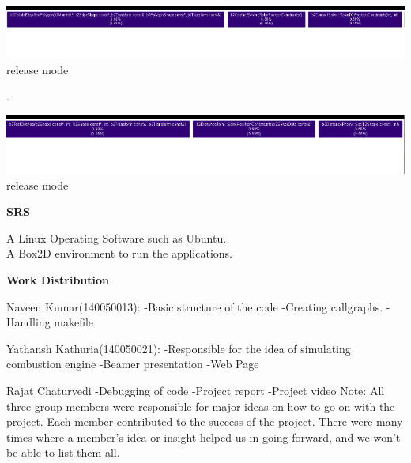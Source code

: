 \documentclass[40pt]{article}
\begin{document}
\begin{center}
\includegraphics[scale=0.4]{release6.png}\newline
\small{release mode\\}
\end{center}

.
\begin{center}
\includegraphics[scale=0.4]{release7.png}\newline
\small{release mode\\}
\end{center}

\newpage



\begin{center}

\huge{
\textbf{SRS\\}}
\end{center}
\Large
{
A Linux Operating Software such as Ubuntu.\\
A Box2D environment to run the applications.\\
}

\begin{center}

\huge{
\textbf{Work Distribution\\}}
\end{center}
\Large
{
Naveen Kumar(140050013):\newline
-Basic structure of the code\newline
-Creating callgraphs.\newline
-Handling makefile\newline
\newline

Yathansh Kathuria(140050021):\newline
-Responsible for the idea of simulating combustion engine\newline
-Beamer presentation\newline
-Web Page\newline
\newline

Rajat Chaturvedi\newline
-Debugging of code\newline
-Project report\newline
-Project video\newline
\newline
Note: All three group members were responsible for major ideas on how to go on with the project. Each member contributed to the success of the project. There were many times where a member's idea or insight helped us in going forward, and we won't be able to list them all.
\newline
}
\end{document}

